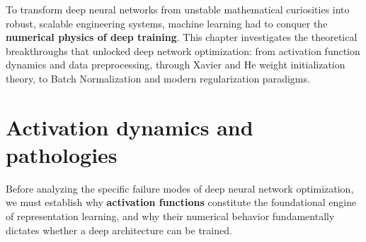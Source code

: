 To transform deep neural networks from unstable mathematical curiosities into robust, scalable engineering systems, machine learning had to conquer the \textbf{numerical physics of deep training}. This chapter investigates the theoretical breakthroughs that unlocked deep network optimization: from activation function dynamics and data preprocessing, through Xavier and He weight initialization theory, to Batch Normalization and modern regularization paradigms.

\section{Activation dynamics and pathologies}
\label{sec:activation_dynamics_pathologies}

Before analyzing the specific failure modes of deep neural network optimization, we must establish why \textbf{activation functions} constitute the foundational engine of representation learning, and why their numerical behavior fundamentally dictates whether a deep architecture can be trained.

